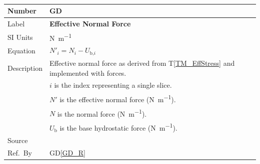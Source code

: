 \documentclass[12pt]{article}
\newcommand{\colAwidth}{0.13\textwidth}
\newcommand{\colBwidth}{0.82\textwidth}
\newcommand{\tref}[1]{T\ref{#1}}
\renewcommand{\arraystretch}{1}
\newcounter{defnum} %
\newcommand{\dref}[1]{GD\ref{#1}}
\begin{document}
~\newline

\noindent
\begin{minipage}{\textwidth}
	\renewcommand*{\arraystretch}{1.5}
	\begin{tabular}{| p{\colAwidth} | p{\colBwidth}|}
		
		\hline \rowcolor[gray]{0.9} Number&
		GD{defnum}\thedefnum \label{GD_EffNormal}\\
		
		\hline Label&\bf Effective Normal Force\\
		\hline SI Units & \si{\newton\per\meter}\\
		
		\hline Equation & \( N'_{i} = N_{i} - U_{\text{b,}i} \) \\
	
	\hline Description & Effective normal force as derived from 
	\tref{TM_EffStress} and implemented with forces. 
	\\
	&$i$ is the index representing a single slice.\\
	&$N'$ is the effective normal force (\si{\newton\per\meter}).\\
	&$N$ is the normal force (\si{\newton\per\meter}).\\
	&$U_\text{b}$ is the base hydrostatic force (\si{\newton\per\meter}).\\
	
	\hline Source & \cite{ZhuEtAl2005}\\
	
	\hline Ref.\ By & \dref{GD_R} \\
	
	\hline
\end{tabular}
\end{minipage}\\

~\newline

\end{document}
